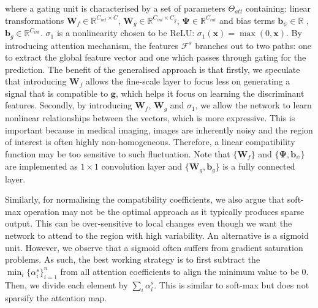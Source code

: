 \documentclass{article}
\providecommand{\mb}[1]{\mathbf{#1}}
\providecommand{\mbb}[1]{\boldsymbol{#1}}
\begin{document}
where a gating unit is characterised by a set of parameters $\Theta_{att}$ containing: linear transformations $\mb{W}_f \in \mathbb{R}^{C_{int} \times C}$, $\mb{W}_g \in  \mathbb{R}^{C_{int} \times C_{g}}$, $\mbb{\Psi} \in \mathbb{R}^{C_{int} }$ and bias terms $\mb{b}_{\psi} \in \mathbb{R}$ , $\mb{b}_{g} \in \mathbb{R}^{C_{int}}$. $\sigma_1$ is a nonlinearity chosen to be ReLU: $\sigma_1(\mb{x}) = \max (0, \mb{x})$. By introducing attention mechanism, the features $\mathcal{F}^s$ branches out to two paths: one to extract the global feature vector and one which passes through gating for the prediction. The benefit of the generalised approach is that firstly, we speculate that introducing $\mb{W}_f$ allows the fine-scale layer to focus less on generating a signal that is compatible to $\mb{g}$, which helps it focus on learning the discriminant features. Secondly, by introducing $\mb{W}_f$, $\mb{W}_g$ and $\sigma_1$, we allow the network to learn nonlinear relationships between the vectors, which is more expressive. This is important because in medical imaging, images are inherently noisy and the region of interest is often highly non-homogeneous. Therefore, a linear compatibility function may be too sensitive to such fluctuation. Note that $\{\mb{W}_f\}$ and $\{\mbb{\Psi}, \mb{b}_\psi\}$ are implemented as $1 \times 1$ convolution layer and $\{\mb{W}_g, \mb{b}_g\}$ is a fully connected layer. 

Similarly, for normalising the compatibility coefficients, we also argue that soft-max operation may not be the optimal approach as it typically produces sparse output. This can be over-sensitive to local changes even though we want the network to attend to the region with high variability. An alternative is a sigmoid unit. However, we observe that a sigmoid often suffers from gradient saturation problems. As such, the best working strategy is to first subtract the $\min_i \{ \alpha_i^s\}_{i=1}^n$ from all attention coefficients to align the minimum value to be 0. Then, we divide each element by $\sum_i \alpha_i^s$. This is similar to soft-max but does not sparsify the attention map.
\end{document}
